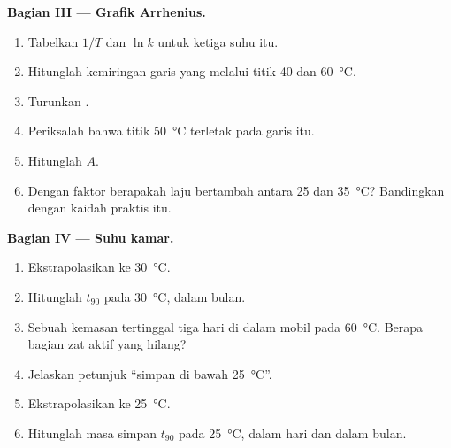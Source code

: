 \begin{problem}
\medskip
\noindent\textbf{Bagian III --- Grafik Arrhenius.}
\begin{enumerate}[resume]
  \item Tabelkan $1/T$ dan $\ln k$ untuk ketiga suhu itu.
  \item Hitunglah kemiringan garis yang melalui titik 40 dan
        \qty{60}{\celsius}.
  \item Turunkan .
  \item Periksalah bahwa titik \qty{50}{\celsius} terletak pada garis itu.
  \item Hitunglah  $A$.
  \item Dengan faktor berapakah laju bertambah antara 25 dan
        \qty{35}{\celsius}? Bandingkan dengan kaidah praktis itu.
\end{enumerate}

\medskip
\noindent\textbf{Bagian IV --- Suhu kamar.}
\begin{enumerate}[resume]
  \item Ekstrapolasikan  ke \qty{30}{\celsius}.
  \item Hitunglah $t_{90}$ pada \qty{30}{\celsius}, dalam bulan.
  \item Sebuah kemasan tertinggal tiga hari di dalam mobil pada
        \qty{60}{\celsius}. Berapa bagian zat aktif yang hilang?
  \item Jelaskan petunjuk ``simpan di bawah \qty{25}{\celsius}''.
  \item Ekstrapolasikan  ke \qty{25}{\celsius}.
  \item Hitunglah masa simpan $t_{90}$ pada \qty{25}{\celsius}, dalam hari
        dan dalam bulan.
\end{enumerate}
\end{problem}
